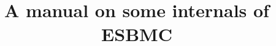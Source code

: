 \documentclass{article}
\begin{document}
\title{A manual on some internals of ESBMC}
\end{document}
